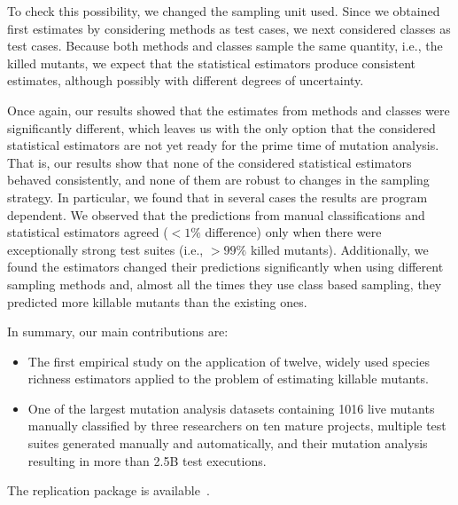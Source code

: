 \documentclass[sigconf,review,anonymous]{acmart}
\newcommand{\estimatorCount}{twelve\xspace}
\begin{document}
To check this possibility, we changed the sampling unit used.
Since we obtained first estimates by
considering methods as test cases, we next
considered classes as test cases.
Because both methods and classes sample the same quantity, i.e., the killed mutants,
we expect that the statistical estimators produce consistent estimates, although
possibly with different degrees of uncertainty.

Once again, our results showed that the estimates from methods and classes were
significantly different, which leaves us with the only option that the considered statistical
estimators are not yet ready for the prime time of mutation analysis.
That is, our results show that none of the considered statistical estimators
behaved consistently, and none of them are robust to changes in the sampling
strategy.
In particular, we found that in several cases the results are program dependent.
We observed that the predictions from manual classifications and
statistical estimators agreed ($<1\%$ difference) only when there were
exceptionally strong test suites (i.e., $>99\%$ killed mutants).
Additionally, we found the estimators changed their predictions significantly
when using different sampling methods and, almost all the times they use class based sampling,
they predicted more killable mutants than the existing ones.

In summary, our main contributions are:
\begin{itemize}
   \item The first empirical study on the application of \estimatorCount,
         widely used species richness estimators applied to the problem of estimating killable mutants.
   \item One of the largest %
mutation analysis datasets containing 1016 live mutants manually
classified by three researchers on ten mature projects,
multiple test suites generated manually and automatically,
and their mutation analysis resulting in more than 2.5B test executions.
\end{itemize}
The replication package is available~\cite{replication-package}.
\end{document}

